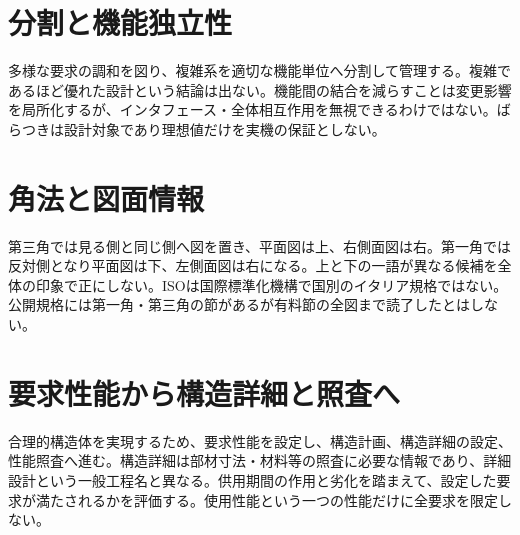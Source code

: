 \section{分割と機能独立性}\label{theory:design:principles}
多様な要求の調和を図り、複雑系を適切な機能単位へ分割して管理する。複雑であるほど優れた設計という結論は出ない。機能間の結合を減らすことは変更影響を局所化するが、インタフェース・全体相互作用を無視できるわけではない。ばらつきは設計対象であり理想値だけを実機の保証としない。
\section{角法と図面情報}\label{theory:design:drawing}
第三角では見る側と同じ側へ図を置き、平面図は上、右側面図は右。第一角では反対側となり平面図は下、左側面図は右になる。上と下の一語が異なる候補を全体の印象で正にしない。ISOは国際標準化機構で国別のイタリア規格ではない。公開規格には第一角・第三角の節があるが有料節の全図まで読了したとはしない。\cite{design48_iso}
\section{要求性能から構造詳細と照査へ}\label{theory:design:performance}
合理的構造体を実現するため、要求性能を設定し、構造計画、構造詳細の設定、性能照査へ進む。構造詳細は部材寸法・材料等の照査に必要な情報であり、詳細設計という一般工程名と異なる。供用期間の作用と劣化を踏まえて、設定した要求が満たされるかを評価する。使用性能という一つの性能だけに全要求を限定しない。\cite{design48_mlit}
